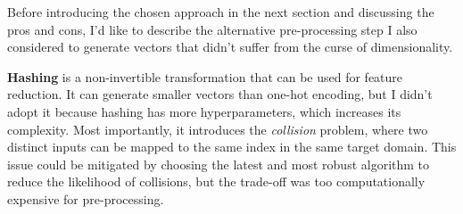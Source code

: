 Before introducing the chosen approach in the next section and discussing the pros and cons,
I'd like to describe the alternative pre-processing step I also considered to generate vectors
that didn't suffer from the curse of dimensionality.

\textbf{Hashing} is a non-invertible transformation that can be used for feature reduction.
It can generate smaller vectors than one-hot encoding, but I didn't adopt it
because hashing has more hyperparameters, which increases its complexity.
Most importantly, it introduces the \textit{collision} problem,
where two distinct inputs can be mapped to the same index in the same target domain.
This issue could be mitigated by choosing the latest and most robust algorithm to reduce the likelihood of collisions,
but the trade-off was too computationally expensive for pre-processing.
